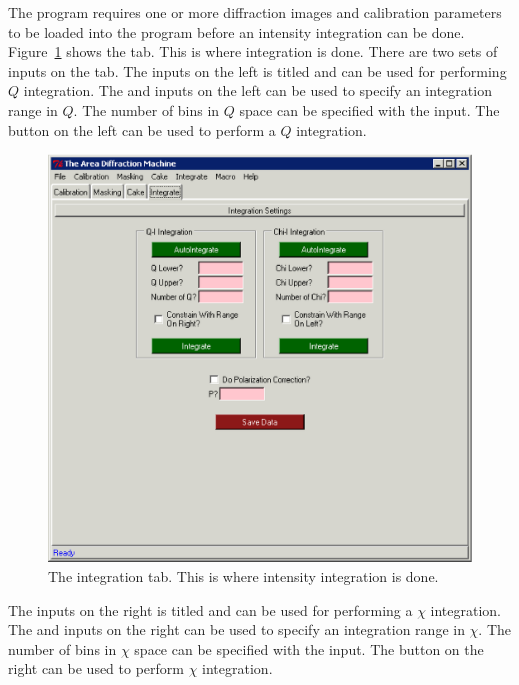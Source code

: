 The program requires one or more diffraction images and
calibration parameters to be loaded into the program
before an intensity integration can be done.
Figure~\ref{integration_tab} shows the
 tab. This is where integration is done.
There are two sets of inputs on the tab. 
The inputs on the left is titled 
and can be used for performing $Q$ integration.
The  and  inputs on the left 
can be used to specify an integration range in $Q$.
The number of bins in $Q$ space can be specified with the
 input. The  button
on the left can be used to perform a $Q$ integration.

\begin{figure}
    \centering
    \includegraphics[scale=.75]{figures/integration_tab.eps}
    \caption{The integration tab. This is where intensity
    integration is done.} 
    \label{integration_tab}
\end{figure}

The inputs on the right is titled 
and can be used for performing a $\chi$ integration.
The  and  inputs on the right
can be used to specify an integration range in $\chi$.
The number of bins in $\chi$ space can be specified with the
 input. The  button
on the right can be used to perform $\chi$ integration.


